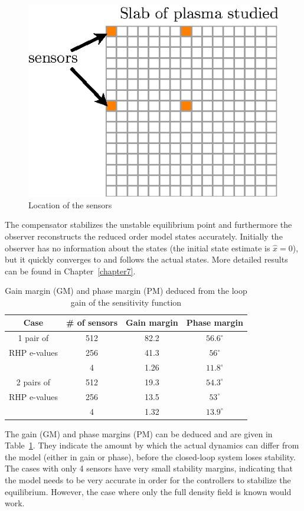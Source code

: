 \documentclass[12pt,lot, lof]{puthesis}
\begin{document}
\begin{figure}[htbp]
\centering
\includegraphics[width=0.5\linewidth]{observer4}
\caption{Location of the sensors}
\label{lqg4a}
\end{figure}

The compensator stabilizes the unstable equilibrium point and furthermore the observer reconstructs the reduced order model states accurately. Initially the observer has no information about the states (the initial state estimate is $\hat x = 0$), but it quickly converges to and follows the actual states. More detailed results can be found in Chapter~\ref{chapter7}.

\begin{table}[htbp]
	\centering
	\caption{Gain margin (GM) and phase margin (PM) deduced from the loop gain of the sensitivity function}
	\label{table4c}
	\begin{tabular}{cccc} \\[-0.5em] \hline
		Case & \# of sensors & Gain margin & Phase margin \\ \hline
		1 pair of  & 512&82.2&$56.6^\circ$   \\ 
		RHP e-values  & 256& 41.3&$56 ^\circ $\\ 
		  &4 & 1.26& $11.8^\circ$ \\ \hline
		2 pairs of  &512 &19.3 &$54.3^\circ$ \\ 
		RHP e-values  &256 & 13.5& $53^\circ$ \\ 
		  &4 & 1.32& $13.9^\circ$\\ \hline
	\end{tabular}
\end{table}

The gain (GM) and phase margins (PM) can be deduced and are given in Table~\ref{table4c}. They indicate the amount by which the actual dynamics can differ from the model (either in gain or phase), before the closed-loop system loses stability.  The cases with only 4 sensors have very small stability margins, indicating that the model needs to be very accurate in order for the controllers to stabilize the equilibrium.
However, the case where only the full density field is known would work.
\end{document}
